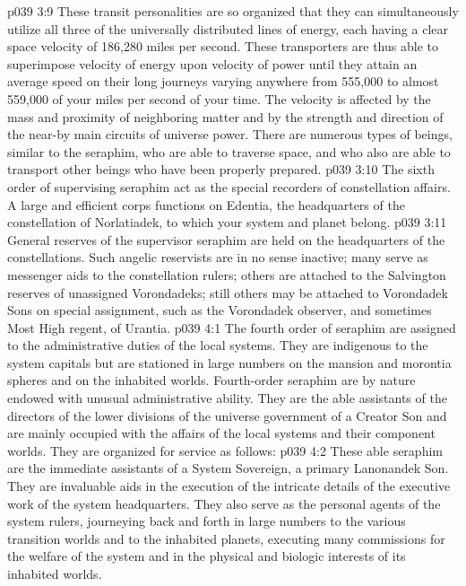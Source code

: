 \vs p039 3:9 These transit personalities are so organized that they can simultaneously utilize all three of the universally distributed lines of energy, each having a clear space velocity of 186,280 miles per second. These transporters are thus able to superimpose velocity of energy upon velocity of power until they attain an average speed on their long journeys varying anywhere from 555,000 to almost 559,000 of your miles per second of your time. The velocity is affected by the mass and proximity of neighboring matter and by the strength and direction of the near\hyp{}by main circuits of universe power. There are numerous types of beings, similar to the seraphim, who are able to traverse space, and who also are able to transport other beings who have been properly prepared.
\pc \vs p039 3:10 \bibnobreakspace {} The sixth order of supervising seraphim act as the special recorders of constellation affairs. A large and efficient corps functions on Edentia, the headquarters of the constellation of Norlatiadek, to which your system and planet belong.\plusone
\pc \vs p039 3:11 \bibnobreakspace {} General reserves of the supervisor seraphim are held on the headquarters of the constellations. Such angelic reservists are in no sense inactive; many serve as messenger aids to the constellation rulers; others are attached to the Salvington reserves of unassigned Vorondadeks; still others may be attached to Vorondadek Sons on special assignment, such as the Vorondadek observer, and sometimes Most High regent, of Urantia.
\vs p039 4:1 The fourth order of seraphim are assigned to the administrative duties of the local systems. They are indigenous to the system capitals but are stationed in large numbers on the mansion and morontia spheres and on the inhabited worlds. Fourth\hyp{}order seraphim are by nature endowed with unusual administrative ability. They are the able assistants of the directors of the lower divisions of the universe government of a Creator Son and are mainly occupied with the affairs of the local systems and their component worlds. They are organized for service as follows:
\pc \vs p039 4:2 \bibnobreakspace {} These able seraphim are the immediate assistants of a System Sovereign, a primary Lanonandek Son. They are invaluable aids in the execution of the intricate details of the executive work of the system headquarters. They also serve as the personal agents of the system rulers, journeying back and forth in large numbers to the various transition worlds and to the inhabited planets, executing many commissions for the welfare of the system and in the physical and biologic interests of its inhabited worlds.
